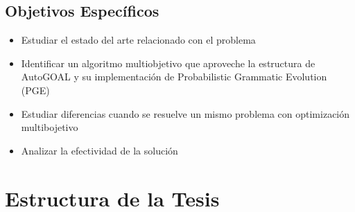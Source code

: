 \subsection*{Objetivos Espec\'ificos}
\begin{itemize}
    \item Estudiar el estado del arte relacionado con el problema
    \item Identificar un algoritmo multiobjetivo que aproveche la estructura de AutoGOAL y su implementaci\'on de Probabilistic Grammatic Evolution (PGE)
    \item Estudiar diferencias cuando se resuelve un mismo problema con optimizaci\'on multibojetivo
    \item Analizar la efectividad de la soluci\'on
\end{itemize}

\section*{Estructura de la Tesis}
